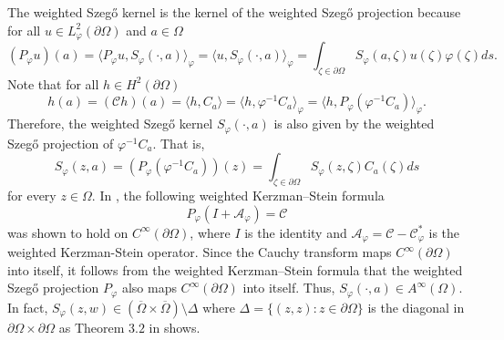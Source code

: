 \documentclass[11pt, reqno]{amsart}
\numberwithin{equation}{section}
\newcommand{\pa}{\partial}
\newcommand{\Om}{\Omega}
\begin{document}
The weighted Szeg\H{o} kernel is the kernel of the weighted Szeg\H{o} projection because for all $u\in L^2_{\varphi}(\partial\Omega)$ and $a\in\Omega$
\begin{equation}
(P_{\varphi}u)(a) = \langle P_{\varphi}u, S_{\varphi}(\cdot, a)\rangle_{\varphi}=\langle u, S_{\varphi}(\cdot, a)\rangle_{\varphi} = \int_{\zeta\in\partial\Omega}S_{\varphi}(a,\zeta)u(\zeta)\varphi(\zeta) ds.
\end{equation}
Note that for all $h\in H^2(\partial\Omega)$
\[
h(a) = (\mathcal{C}h)(a) = \langle h, C_a\rangle = \langle h, \varphi^{-1}C_a\rangle_{\varphi} =  \langle h, P_{\varphi}(\varphi^{-1}C_a)\rangle_{\varphi}.
\]
Therefore, the weighted Szeg\H{o} kernel $S_{\varphi}(\cdot,a)$ is also given by the weighted Szeg\H{o} projection of $\varphi^{-1}C_a$.
That is,
\begin{equation}
S_{\varphi}(z,a)=(P_{\varphi} (\varphi^{-1}C_a))(z)=\int_{\zeta\in\partial\Omega}S_{\varphi}(z,\zeta)C_a(\zeta) ds
\end{equation}
for every $z\in\Omega$. In \cite{JV}, the following weighted Kerzman--Stein formula
\begin{equation}
P_{\varphi}(I+\mathcal{A}_{\varphi})=\mathcal{C}
\end{equation}
was shown to hold on $C^{\infty}(\partial\Omega)$, where $I$ is the identity and $\mathcal{A}_{\varphi} = \mathcal{C}-\mathcal{C}^{*}_{\varphi}$ is the weighted Kerzman-Stein operator. Since the Cauchy transform maps $C^{\infty}(\partial\Omega)$ into itself, it follows from the weighted Kerzman--Stein formula that the weighted Szeg\H{o} projection $P_{\varphi}$ also maps $C^{\infty}(\partial\Omega)$ into itself. Thus, $S_{\varphi}(\cdot,a)\in A^{\infty}(\Omega)$. In fact, $S_{\varphi}(z, w) \in \left( \overline \Om \times \overline \Om \right) \setminus \Delta$ where $\Delta = \{(z, z): z \in \pa \Omega\}$ is the diagonal in $\pa \Om \times \pa \Om$ as Theorem $3.2$ in \cite{JV} shows.

\medskip
\end{document}
